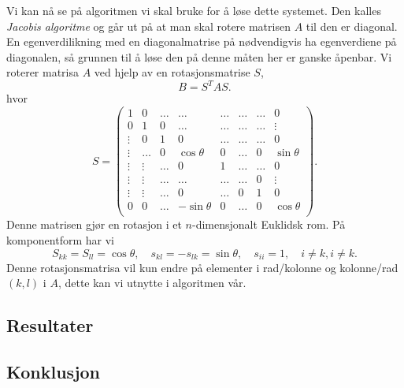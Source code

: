 \documentclass[norsk, 11pt]{article}
\begin{document}
Vi kan nå se på algoritmen vi skal bruke for å løse dette systemet. Den kalles \emph{Jacobis algoritme} og går ut på at man skal rotere matrisen $A$ til den er diagonal. En egenverdilikning med en diagonalmatrise på nødvendigvis ha egenverdiene på diagonalen, så grunnen til å løse den på denne måten her er ganske åpenbar. Vi roterer matrisa $A$ ved hjelp av en rotasjonsmatrise $S$,
$$ B = S^T A S. $$ 
hvor 
\begin{equation*}
S = \left(\begin{matrix}
1 & 0 & \ldots & \ldots & \ldots & \ldots & \ldots & 0 \\
0 & 1 & 0 & \ldots & \ldots & \ldots & \ldots & \vdots \\
\vdots & 0 & 1 & 0 & \ldots & \ldots & \ldots & 0 \\
\vdots & \ldots & 0 & \cos\theta & 0 & \ldots & 0 & \sin\theta \\
\vdots & \vdots & \ldots & 0 & 1 & \ldots & \ldots & 0 \\
\vdots & \vdots & \ldots & \ldots & \ldots & \ldots & 0 & \vdots \\
\vdots & \vdots & \ldots & 0 & \ldots & 0 & 1 & 0 \\
0 & 0 & \ldots & -\sin\theta & 0 & \ldots & 0 & \cos \theta \\
\end{matrix}\right).
\end{equation*}
Denne matrisen gjør en rotasjon i et $n$-dimensjonalt Euklidsk rom. På komponentform har vi
$$ S_{kk} = S_{ll} = \cos\theta,\quad s_{kl} = -s_{lk} = \sin\theta,\quad s_{ii} = 1,\quad i \neq k, i \neq k. $$
Denne rotasjonsmatrisa vil kun endre på elementer i rad/kolonne og kolonne/rad $(k,l)$ i $A$, dette kan vi utnytte i algoritmen vår.

\subsection*{Resultater}

\subsection*{Konklusjon}
\end{document}
